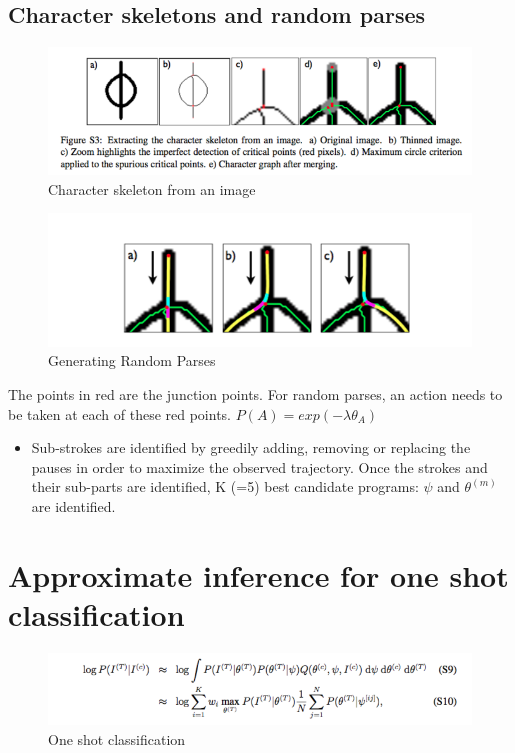 \documentclass[11pt]{article}
\begin{document}
\subsection{Character skeletons and random parses}
\label{sec-9-1}
\begin{figure}[htb]
\centering
\includegraphics[width=.9\linewidth]{./md_slides/_images/bpl_skeleton.png}
\caption{Character skeleton from an image}
\end{figure}

\begin{figure}[htb]
\centering
\includegraphics[width=.9\linewidth]{./md_slides/_images/bpl_parses.png}
\caption{Generating Random Parses}
\end{figure}

The points in red are the junction points.
For random parses, an action needs to be taken at each of these red points.
$P(A) = exp(-\lambda\theta_A)$

\begin{itemize}
\item Sub-strokes are identified by greedily adding, removing or replacing the pauses in order to maximize the observed trajectory.
Once the strokes and their sub-parts are identified, K (=5) best candidate programs: $\psi$ and $\theta^{(m)}$ are identified.
\end{itemize}

\section{Approximate inference for one shot classification}
\label{sec-10}
\begin{figure}[htb]
\centering
\includegraphics[width=.9\linewidth]{./md_slides/_images/bpl_approx_infer.png}
\caption{One shot classification}
\end{figure}
\end{document}
